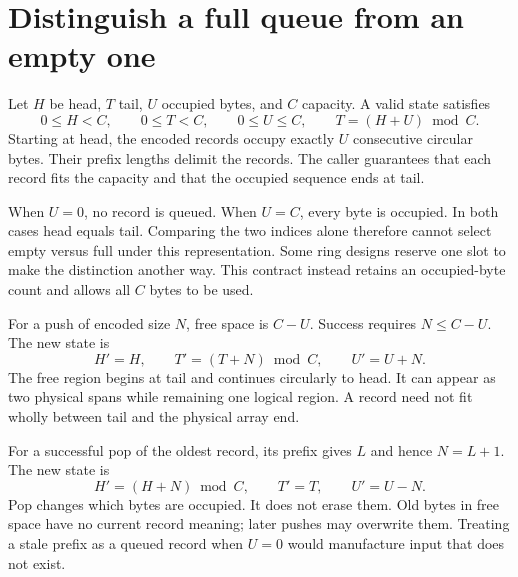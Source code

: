 \section{Distinguish a full queue from an empty one}
Let \(H\) be head, \(T\) tail, \(U\) occupied bytes, and \(C\) capacity. A valid
state satisfies
\[
  0\leq H<C,\qquad0\leq T<C,\qquad0\leq U\leq C,
  \qquad T=(H+U)\bmod C.
\]
Starting at head, the encoded records occupy exactly \(U\) consecutive circular
bytes. Their prefix lengths delimit the records. The caller guarantees that each
record fits the capacity and that the occupied sequence ends at tail.

When \(U=0\), no record is queued. When \(U=C\), every byte is occupied. In both
cases head equals tail. Comparing the two indices alone therefore cannot select
empty versus full under this representation. Some ring designs reserve one slot to
make the distinction another way. This contract instead retains an occupied-byte
count and allows all \(C\) bytes to be used.

For a push of encoded size \(N\), free space is \(C-U\). Success requires
\(N\leq C-U\). The new state is
\[
  H'=H,\qquad T'=(T+N)\bmod C,\qquad U'=U+N.
\]
The free region begins at tail and continues circularly to head. It can appear as
two physical spans while remaining one logical region. A record need not fit wholly
between tail and the physical array end.

For a successful pop of the oldest record, its prefix gives \(L\) and hence
\(N=L+1\). The new state is
\[
  H'=(H+N)\bmod C,\qquad T'=T,\qquad U'=U-N.
\]
Pop changes which bytes are occupied. It does not erase them. Old bytes in free
space have no current record meaning; later pushes may overwrite them. Treating a
stale prefix as a queued record when \(U=0\) would manufacture input that does not
exist.
